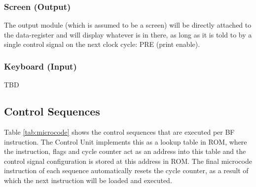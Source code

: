 \subsubsection{Screen (Output)}
The output module (which is assumed to be a screen) will be directly attached to the data-register and will display whatever is in there, as long as it is told to by a single control signal on the next clock cycle: PRE (print enable).

\subsubsection{Keyboard (Input)}
TBD

\subsection{Control Sequences} \label{sec:architecture:sequences}
Table \ref{tab:microcode} shows the control sequences that are executed per BF instruction. The Control Unit implements this as a lookup table in ROM, where the instruction, flags and cycle counter act as an address into this table and the control signal configuration is stored at this address in ROM. The final microcode instruction of each sequence automatically resets the cycle counter, as a result of which the next instruction will be loaded and executed.

